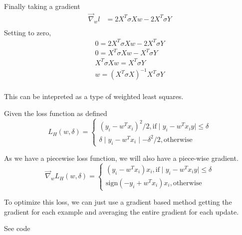 \documentclass[12pt]{article}
\newenvironment{problem}[2][Problem]{\begin{trivlist}
\item[\hskip \labelsep {\bfseries #1}\hskip \labelsep {\bfseries #2.}]}{\end{trivlist}}
\begin{document}
Finally taking a gradient
\begin{align*}
    \vec\nabla_{w} l &= 2 X^T \sigma X w - 2X^T \sigma Y  \\ 
\end{align*}
Setting to zero, 
\begin{gather*}
     0 = 2 X^T \sigma X w - 2X^T \sigma Y  \\ 
     0 =  X^T \sigma X w - X^T \sigma Y  \\ 
     X^T \sigma X w = X^T \sigma Y  \\ 
      w = (X^T \sigma X)^{-1} X^T \sigma Y  \\ 
\end{gather*}

This can be intepreted as a type of weighted least squares. 

\begin{problem}{3. (a)}
Given the loss function as defined
\[
        L_H(w,\delta) = 
                \begin{cases} 
                (y_i - w^T x_i)^2 / 2 ,  \text{if} \mid y_i - w^T x_i y \mid \leq \delta \\ 
                \delta \mid  y_i - w^T x_i  \mid - \delta^2 /2, \text{otherwise}
                \end{cases}
\]
\end{problem}

As we have a piecewise loss function, we will also have a piece-wise gradient.
\[
        \vec \nabla_w L_H(w,\delta) = 
                \begin{cases} 
                (y_i - w^T x_i) x_i ,  \text{if} \mid y_i - w^T x_i y \mid \leq \delta \\ 
                \text{sign}(-y_i + w^T x_i)x_i , \text{otherwise} 
                \end{cases}
\]

\begin{problem}{3. (b)}
\end{problem}
To optimize this loss, we can just use a gradient based method getting the gradient for
each example and averaging the entire gradient for each update.

\begin{problem}{3. (c)}
See code
\end{problem}
\end{document}
